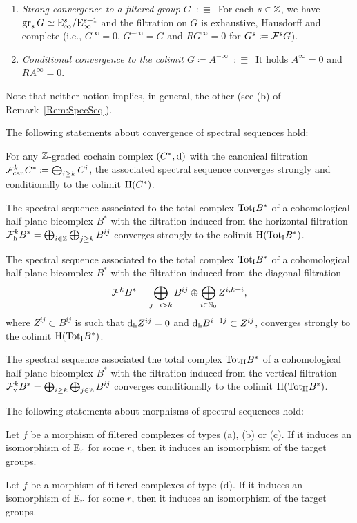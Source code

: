\documentclass[\MainFolder/Text.tex]{subfiles}
\begin{document}
\begin{enumerate}
\item\emph{Strong convergence to a filtered group $G$}\ $:\Equiv$\ For each $s\in \mathbb{Z}$, we have $\operatorname{\mathrm{gr}}_s G \simeq \mathrm{E}_\infty^s/\mathrm{E}_\infty^{s+1}$ and the filtration on $G$ is exhaustive, Hausdorff and complete (i.e., $G^\infty = 0$, $G^{-\infty} = G$ and $RG^\infty = 0$ for $G^s \coloneqq \mathcal{F}^s G$).
\item\emph{Conditional convergence to the colimit $G\coloneqq A^{-\infty}$}\ $:\Equiv$\ It holds $A^\infty = 0$ and $RA^\infty = 0$.
\end{enumerate}
Note that neither notion implies, in general, the other (see (b) of Remark~\ref{Rem:SpecSeq}).

\begin{Proposition}\label{Prop:ConvOfSpSeq}
The following statements about convergence of spectral sequences hold:
\begin{ClaimList}
\item For any $\mathbb{Z}$-graded cochain complex $(C^*,\mathrm{d})$ with the canonical filtration $\mathcal{F}^k_{{\mathrm{can}}} C^* \coloneqq \bigoplus_{i\ge k} C^i$, the associated spectral sequence converges strongly and conditionally to the colimit $\mathrm{H}(C^*)$.
\item The spectral sequence associated to the total complex ${\mathrm{Tot}_{\mathrm{I}}} B^*$ of a cohomological half-plane bicomplex $B^*$ with the filtration induced from the horizontal filtration $\mathcal{F}^k_{{\mathrm{h}}} B^* = \bigoplus_{i\in\mathbb{Z}}\bigoplus_{j\ge k} B^{ij}$ converges strongly to the colimit $\mathrm{H}({\mathrm{Tot}_{\mathrm{I}}} B^*)$.
\item The spectral sequence associated to the total complex ${\mathrm{Tot}_{\mathrm{I}}} B^*$ of a cohomological half-plane bicomplex $B^{*}$ with the filtration induced from the diagonal filtration 
\[ \mathcal{F}^k B^* = \bigoplus_{j-i>k} B^{ij} \oplus \bigoplus_{i\in \mathbb{N}_0} Z^{i,k+i}, \]
where $Z^{ij} \subset B^{i j}$ is such that $\mathrm{d}_{{\mathrm{h}}} Z^{ij} = 0$ and $\mathrm{d}_{{\mathrm{h}}} B^{i-1 j} \subset Z^{ij}$, converges strongly to the colimit $\mathrm{H}({\mathrm{Tot}_{\mathrm{I}}} B^*)$.
\item The spectral sequence associated the total complex ${\mathrm{Tot}_{\mathrm{II}}} B^*$ of a cohomological half-plane bicomplex $B^{*}$ with the filtration induced from the vertical filtration $\mathcal{F}^k_{{\mathrm{v}}} B^* = \bigoplus_{i\ge k}\bigoplus_{j\in\mathbb{Z}} B^{ij}$ converges conditionally to the colimit $\mathrm{H}({\mathrm{Tot}_{\mathrm{II}}} B^*)$.
\end{ClaimList}
The following statements about morphisms of spectral sequences hold:
\begin{ClaimList}[resume]
\item Let $f$ be a morphism of filtered complexes of types (a), (b) or (c). If it induces an isomorphism of $\mathrm{E}_r$ for some $r$, then it induces an isomorphism of the target groups.
\item Let $f$ be a morphism of filtered complexes of type (d). If it induces an isomorphism of $\mathrm{E}_r$ for some $r$, then it induces an isomorphism of the target groups.
\end{ClaimList}
\end{Proposition}
\end{document}

